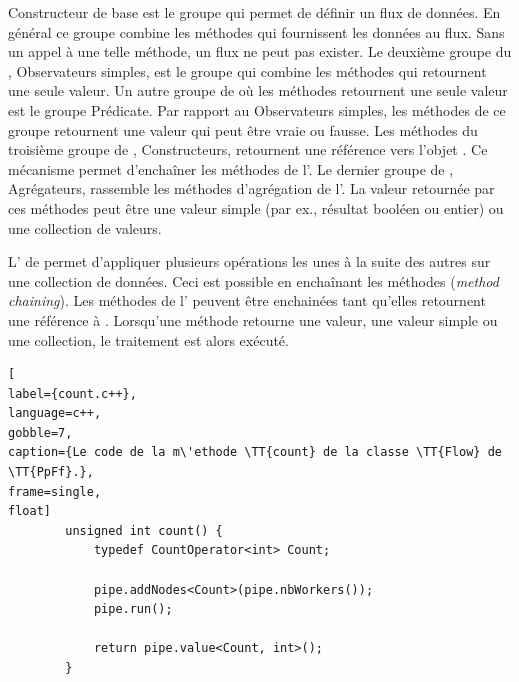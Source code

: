 Constructeur de base est le groupe qui permet de d\'efinir un flux de donn\'ees. En g\'en\'eral ce groupe combine les m\'ethodes qui fournissent les donn\'ees au flux. Sans un appel \`a une telle m\'ethode, un flux ne peut pas exister. Le deuxi\`eme groupe du , Observateurs simples, est le groupe qui combine les m\'ethodes qui retournent une seule valeur. Un autre groupe de  o\`u les m\'ethodes retournent une seule valeur est le groupe Pr\'edicate. Par rapport au Observateurs simples, les m\'ethodes de ce groupe retournent une valeur qui peut \^etre vraie ou fausse. Les m\'ethodes du troisi\`eme groupe de , Constructeurs, retournent une r\'ef\'erence vers l'objet . Ce m\'ecanisme permet d'encha\^iner les m\'ethodes de l'. Le dernier groupe de , Agr\'egateurs, rassemble les m\'ethodes d'agr\'egation de l'. La valeur retourn\'ee par ces m\'ethodes peut \^etre une valeur simple (par ex., r\'esultat bool\'een ou entier) ou une collection de valeurs.

L' de  permet d'appliquer plusieurs op\'erations les unes à la suite des autres sur une collection de donn\'ees. Ceci est possible en encha\^inant les m\'ethodes (\emph{method chaining}). Les m\'ethodes de l' peuvent \^etre enchain\'ees tant qu'elles retournent une r\'ef\'erence \`a . Lorsqu'une m\'ethode retourne une valeur, une valeur simple ou une collection, le traitement est alors ex\'ecut\'e. 


\begin{lstlisting}[
label={count.c++},
language=c++,
gobble=7,
caption={Le code de la m\'ethode \TT{count} de la classe \TT{Flow} de \TT{PpFf}.},
frame=single,
float]
        unsigned int count() {
            typedef CountOperator<int> Count;
            
            pipe.addNodes<Count>(pipe.nbWorkers());
            pipe.run();

            return pipe.value<Count, int>();
        }
\end{lstlisting}




